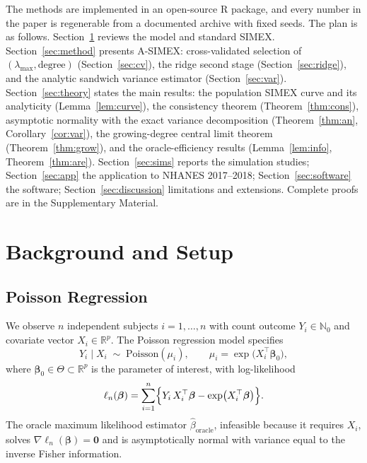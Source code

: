 \documentclass[3p,11pt]{elsarticle}
\theoremstyle{plain}
\theoremstyle{definition}
\newcommand{\R}{\mathbb{R}}
\newcommand{\N}{\mathbb{N}}
\newcommand{\bet}{\bm{\beta}}
\begin{document}
The methods are implemented in an open-source R package, and every
number in the paper is regenerable from a documented archive with
fixed seeds. The plan is as follows. Section~\ref{sec:background}
reviews the model and standard SIMEX. Section~\ref{sec:method}
presents A-SIMEX: cross-validated selection of
$(\lambda_{\max},\text{degree})$ (Section~\ref{sec:cv}), the ridge
second stage (Section~\ref{sec:ridge}), and the analytic sandwich
variance estimator (Section~\ref{sec:var}). Section~\ref{sec:theory}
states the main results: the population SIMEX curve and its
analyticity (Lemma~\ref{lem:curve}), the consistency theorem
(Theorem~\ref{thm:cons}), asymptotic normality with the exact
variance decomposition (Theorem~\ref{thm:an},
Corollary~\ref{cor:var}), the growing-degree central limit theorem
(Theorem~\ref{thm:grow}), and the oracle-efficiency results
(Lemma~\ref{lem:info}, Theorem~\ref{thm:are}). Section~\ref{sec:sims}
reports the simulation studies; Section~\ref{sec:app} the application
to NHANES 2017--2018; Section~\ref{sec:software} the software;
Section~\ref{sec:discussion} limitations and extensions. Complete
proofs are in the Supplementary Material.

\label{sec:contrib}\label{sec:roadmap}

\section{Background and Setup}\label{sec:background}

\subsection{Poisson Regression}\label{sec:poisson}

We observe $n$ independent subjects $i=1,\dots,n$ with count outcome
$Y_i\in\N_0$ and covariate vector $X_i\in\R^p$. The Poisson regression
model specifies
\begin{equation}\label{eq:model}
  Y_i\mid X_i\;\sim\;\mathrm{Poisson}(\mu_i),
  \qquad \mu_i=\exp\bigl(X_i^\top\bet_0\bigr),
\end{equation}
where $\bet_0\in\Theta\subset\R^p$ is the parameter of interest, with
log-likelihood
\begin{equation}\label{eq:loglik}
  \ell_n(\bet)=\sum_{i=1}^{n}\Bigl\{Y_i\,X_i^\top\bet
  -\exp\bigl(X_i^\top\bet\bigr)\Bigr\}.
\end{equation}
The oracle maximum likelihood estimator
$\hat\beta_{\mathrm{oracle}}$, infeasible because it requires
$X_i$, solves $\nabla\ell_n(\bet)=\bm 0$ and is asymptotically
normal with variance equal to the inverse Fisher information.
\end{document}
